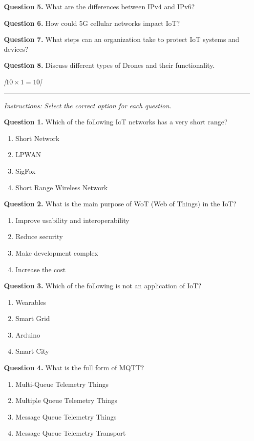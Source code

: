 \documentclass[11pt,a4paper]{article}
\newcommand{\pts}[1]{\hfill\textit{[#1]}}
\begin{document}
\medskip\noindent\textbf{Question 5.} What are the differences between IPv4 and IPv6?

\medskip\noindent\textbf{Question 6.} How could 5G cellular networks impact IoT?

\medskip\noindent\textbf{Question 7.} What steps can an organization take to protect IoT systems and devices?

\medskip\noindent\textbf{Question 8.} Discuss different types of Drones and their functionality.

\bigskip{}\pts{$10 \times 1 = 10$}
\rule{\linewidth}{0.4pt}\smallskip

\noindent\textit{Instructions: Select the correct option for each question.}

\medskip\noindent\textbf{Question 1.} Which of the following IoT networks has a very short range?
\begin{enumerate}[label=(\alph*),itemsep=2pt]
  \item Short Network
  \item LPWAN
  \item SigFox
  \item Short Range Wireless Network
\end{enumerate}

\medskip\noindent\textbf{Question 2.} What is the main purpose of WoT (Web of Things) in the IoT?
\begin{enumerate}[label=(\alph*),itemsep=2pt]
  \item Improve usability and interoperability
  \item Reduce security
  \item Make development complex
  \item Increase the cost
\end{enumerate}

\medskip\noindent\textbf{Question 3.} Which of the following is not an application of IoT?
\begin{enumerate}[label=(\alph*),itemsep=2pt]
  \item Wearables
  \item Smart Grid
  \item Arduino
  \item Smart City
\end{enumerate}

\medskip\noindent\textbf{Question 4.} What is the full form of MQTT?
\begin{enumerate}[label=(\alph*),itemsep=2pt]
  \item Multi-Queue Telemetry Things
  \item Multiple Queue Telemetry Things
  \item Message Queue Telemetry Things
  \item Message Queue Telemetry Transport
\end{enumerate}
\end{document}

